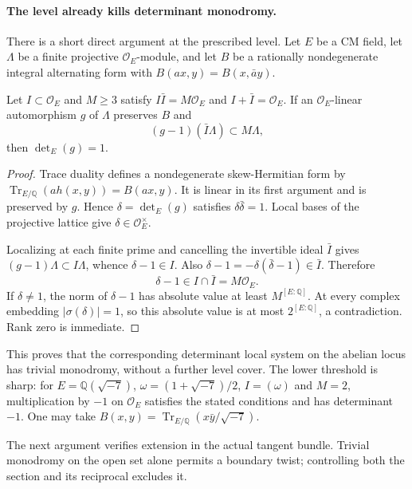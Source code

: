 \paragraph{The level already kills determinant monodromy.}
There is a short direct argument at the prescribed level.
Let $E$ be a CM field, let $\Lambda$ be a finite projective
$\mathcal O_E$-module, and let $B$ be a rationally nondegenerate
integral alternating form with
$B(ax,y)=B(x,\bar a y)$.

\begin{proposition}\label{geo-half-level-determinant}
Let $I\subset\mathcal O_E$ and $M\ge3$ satisfy
$I\bar I=M\mathcal O_E$ and $I+\bar I=\mathcal O_E$.
If an $\mathcal O_E$-linear automorphism $g$ of $\Lambda$
preserves $B$ and
\[
                 (g-1)(\bar I\Lambda)\subset M\Lambda,
\]
then $\det_E(g)=1$.
\end{proposition}
\begin{proof}
Trace duality defines a nondegenerate skew-Hermitian form by
$\operatorname{Tr}_{E/\mathbb Q}(a h(x,y))=B(ax,y)$.
It is linear in its first argument and is preserved by $g$.
Hence $\delta=\det_E(g)$ satisfies
$\delta\bar\delta=1$. Local bases of the projective lattice give
$\delta\in\mathcal O_E^\times$.

Localizing at each finite prime and cancelling the invertible
ideal $\bar I$ gives $(g-1)\Lambda\subset I\Lambda$, whence
$\delta-1\in I$. Also
$\delta-1=-\delta(\bar\delta-1)\in\bar I$. Therefore
\[
                  \delta-1\in I\cap\bar I
                            =M\mathcal O_E.
\]
If $\delta\ne1$, the norm of $\delta-1$ has absolute value at least
$M^{[E:\mathbb Q]}$. At every complex embedding
$|\sigma(\delta)|=1$, so this absolute value is at most
$2^{[E:\mathbb Q]}$, a contradiction. Rank zero is immediate.
\end{proof}

This proves that the corresponding determinant local system on
the abelian locus has trivial monodromy, without a further level
cover. The lower threshold is sharp: for
$E=\mathbb Q(\sqrt{-7})$, $\omega=(1+\sqrt{-7})/2$,
$I=(\omega)$ and $M=2$, multiplication by $-1$ on
$\mathcal O_E$ satisfies the stated conditions and has determinant
$-1$. One may take
$B(x,y)=\operatorname{Tr}_{E/\mathbb Q}(x\bar y/\sqrt{-7})$.

The next argument verifies extension in the actual tangent bundle.
Trivial monodromy on the open set alone permits a boundary twist;
controlling both the section and its reciprocal excludes it.
